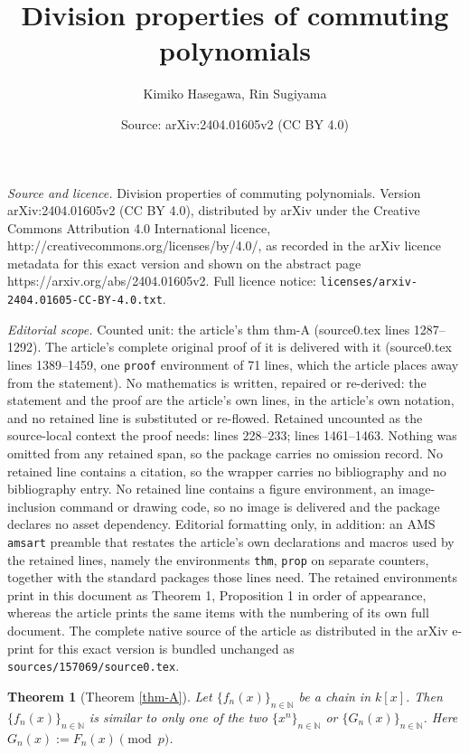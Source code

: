 \documentclass[10pt,a4paper]{amsart}
\title{Division properties of commuting polynomials}
\author{Kimiko Hasegawa, Rin Sugiyama}
\date{Source: arXiv:2404.01605v2 (CC BY 4.0)}
\newtheorem{thm}{Theorem}
\newcommand{\N}{\mathbb{N}}
\begin{document}
\maketitle

\noindent\emph{Source and licence.} Division properties of commuting polynomials. Version arXiv:2404.01605v2 (CC BY 4.0), distributed by arXiv under the Creative Commons Attribution 4.0 International licence, http://creativecommons.org/licenses/by/4.0/, as recorded in the arXiv licence metadata for this exact version and shown on the abstract page https://arxiv.org/abs/2404.01605v2. Full licence notice: \texttt{licenses/arxiv-2404.01605-CC-BY-4.0.txt}.\par\smallskip

\noindent\textit{Editorial scope.} Counted unit: the article's thm thm-A (source0.tex lines 1287--1292). The article's complete original proof of it is delivered with it (source0.tex lines 1389--1459, one \texttt{proof} environment of 71 lines, which the article places away from the statement). No mathematics is written, repaired or re-derived: the statement and the proof are the article's own lines, in the article's own notation, and no retained line is substituted or re-flowed.  Retained uncounted as the source-local context the proof needs: lines 228--233; lines 1461--1463.  Nothing was omitted from any retained span, so the package carries no omission record.  No retained line contains a citation, so the wrapper carries no bibliography and no bibliography entry.  No retained line contains a figure environment, an image-inclusion command or drawing code, so no image is delivered and the package declares no asset dependency.  Editorial formatting only, in addition: an AMS \texttt{amsart} preamble that restates the article's own declarations and macros used by the retained lines, namely the environments \texttt{thm}, \texttt{prop} on separate counters, together with the standard packages those lines need.  The retained environments print in this document as Theorem 1, Proposition 1 in order of appearance, whereas the article prints the same items with the numbering of its own full document.  The complete native source of the article as distributed in the arXiv e-print for this exact version is bundled unchanged as \texttt{sources/157069/source0.tex}.
\begin{thm}[Theorem \ref{thm-A}]\label{intro-thm-A}
Let $\{f_n(x)\}_{n \in \N}$ be a chain in $k[x]$.
Then $\{f_n(x)\}_{n \in \N}$ is similar to only one of the two $\{ x^n\}_{n\in\N}$ or $\{G_n(x)\}_{n\in\N}$.
Here $G_n(x):=F_n(x) \pmod p$.
\end{thm}
\end{document}
